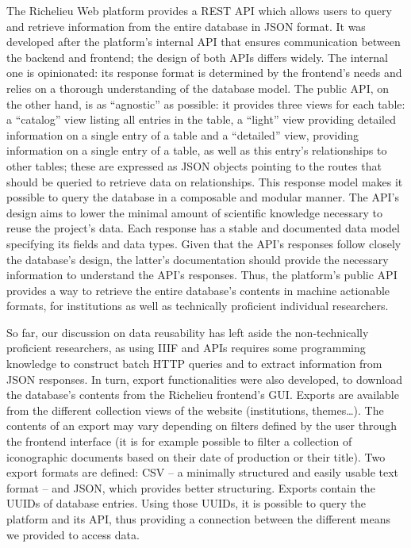 \documentclass[12pt, a4paper, twocolumn]{article}
\begin{document}
The Richelieu Web platform provides a REST API \cite[76-106]{fieldingArchitecturalStylesDesign2000} which allows users to query and retrieve information from the entire database in JSON format. It was developed after the platform's internal API that ensures communication between the backend and frontend; the design of both APIs  differs widely. The internal one  is opinionated: its response format is determined by the frontend's needs and relies on a thorough understanding of the database model. The public API, on the other hand, is as ``agnostic'' as possible: it provides three views for each table: a ``catalog'' view listing all entries in the table, a ``light'' view providing detailed information on a single entry of a table and a ``detailed'' view, providing information on a single entry of a table, as well as this entry's relationships to other tables; these are expressed as JSON objects pointing to the routes that should be queried to retrieve data on relationships. This response model makes it possible to query the database in a composable and modular manner. The API's design aims to lower the minimal amount of scientific knowledge necessary to reuse the project's data. Each response has a stable and documented data model specifying its fields and data types. Given that the API's responses follow closely the database's design, the latter's documentation \parencite{kerveganRIchelieuHistoireQuartier2024} should provide the necessary information to understand the API's responses. Thus, the platform's public API provides a way to retrieve the entire database's contents in machine actionable formats, for institutions as well as technically proficient individual researchers.

So far, our discussion on data reusability has left aside the non-technically proficient researchers, as using IIIF and APIs requires some programming knowledge to construct batch HTTP queries and to extract information from JSON responses. In turn, export functionalities were also developed, to download the database's contents from the Richelieu frontend's GUI. Exports are available from the different collection views of the website (institutions, themes…). The contents of an export may vary depending on filters defined by the user through the frontend interface (it is for example possible to filter a collection of iconographic documents based on their date of production or their title). Two export formats are defined: CSV -- a minimally structured and easily usable text format -- and JSON, which provides better structuring. Exports contain the UUIDs of database entries. Using those UUIDs, it is possible to query the platform and its API, thus providing a connection between the different means we provided to access data.
\end{document}
